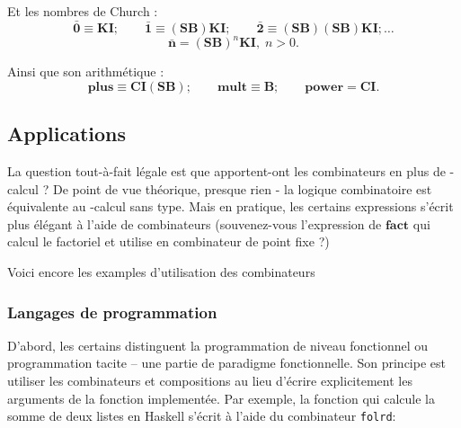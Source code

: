 Et les nombres de Church :
\[\mathbf{\bar{0}} \equiv \mathbf{KI} ; \qquad \mathbf{\bar{1}} \equiv \mathbf{(SB)KI} ; \qquad \mathbf{\bar{2}} \equiv \mathbf{(SB)(SB)KI} ; \ldots\]
\[\mathbf{\bar{n}} = \mathbf{(SB)}^n\mathbf{KI}, \; n > 0.\]

Ainsi que son arithmétique :
\[\mathbf{plus} \equiv \mathbf{CI(SB)} ; \qquad \mathbf{mult} \equiv \mathbf{B} ; \qquad \mathbf{power} = \mathbf{CI}.\]

\subsection*{Applications}
%
%

La question tout-à-fait légale est que apportent-ont les combinateurs en plus de \lam -calcul ? De point de vue théorique, presque rien - la logique combinatoire est équivalente au \lam -calcul sans type. Mais en pratique, les certains expressions s'écrit plus élégant à l'aide de combinateurs (souvenez-vous l'expression de $\mathbf{fact}$ qui calcul le factoriel et utilise en combinateur de point fixe ?)

Voici encore les examples d'utilisation des combinateurs

\subsubsection*{Langages de programmation}

D'abord, les certains distinguent la programmation de niveau fonctionnel ou programmation tacite -- une partie de paradigme fonctionnelle. Son principe est utiliser les combinateurs et compositions au lieu d'écrire explicitement les arguments de la fonction implementée. Par exemple, la fonction qui calcule la somme de deux listes en Haskell s'écrit à l'aide du combinateur \verb|folrd|:

